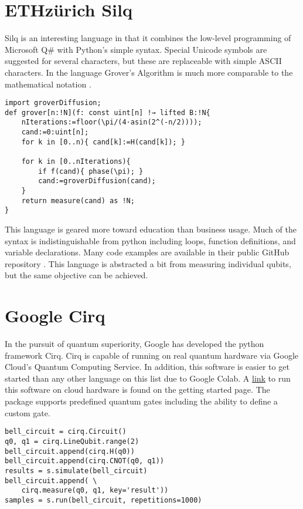 \documentclass[conference]{IEEEtran}
\begin{document}
\section{ETHzürich Silq}
Silq is an interesting language in that it combines the low-level programming of Microsoft Q\# with Python's simple syntax. 
Special Unicode symbols are suggested for several characters, but these are replaceable with simple ASCII characters. 
In the language Grover's Algorithm is much more comparable to the mathematical notation \cite{b8}.
\begin{verbatim}
import groverDiffusion;
def grover[n:!N](f: const uint[n] !→ lifted B:!N{
	nIterations:=floor(\pi/(4·asin(2^(-n/2))));
	cand:=0:uint[n];
    for k in [0..n){ cand[k]:=H(cand[k]); }
    
	for k in [0..nIterations){
		if f(cand){ phase(\pi); }
		cand:=groverDiffusion(cand);
	}
	return measure(cand) as !N;
}
\end{verbatim}
This language is geared more toward education than business usage. 
Much of the syntax is indistinguishable from python including loops, function definitions, and variable declarations. 
Many code examples are available in their public GitHub repository \cite{b9}. 
This language is abstracted a bit from measuring individual qubits, but the same objective can be achieved. 



\section{Google Cirq}
In the pursuit of quantum superiority, Google has developed the python framework Cirq. 
Cirq is capable of running on real quantum hardware via Google Cloud's Quantum Computing Service. 
In addition, this software is easier to get started than any other language on this list due to Google Colab. 
A \href{https://colab.research.google.com/github/quantumlib/Cirq/blob/master/docs/start/start.ipynb}{link} to run this software on cloud hardware is found on the getting started page. 
The package supports predefined quantum gates including the ability to define a custom gate. 

\begin{verbatim}
bell_circuit = cirq.Circuit()
q0, q1 = cirq.LineQubit.range(2)
bell_circuit.append(cirq.H(q0))
bell_circuit.append(cirq.CNOT(q0, q1))
results = s.simulate(bell_circuit)
bell_circuit.append( \
    cirq.measure(q0, q1, key='result'))
samples = s.run(bell_circuit, repetitions=1000)
\end{verbatim}
\end{document}
